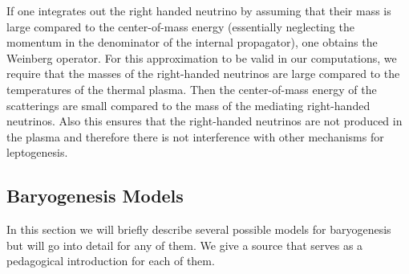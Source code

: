 \documentclass[13pt,a4paper,titlepage]{article}
\begin{document}
If one integrates out the right handed neutrino by assuming that their mass is
large compared to the center-of-mass energy (essentially neglecting the momentum in the denominator of the internal propagator), one obtains the Weinberg operator.
For this approximation to be valid in our computations, we require that
the masses of the right-handed neutrinos are large compared to the temperatures
of the thermal plasma. Then the center-of-mass energy of the scatterings are
small compared to the mass of the mediating right-handed neutrinos.
Also this ensures that the right-handed neutrinos are not produced in the plasma and therefore there is not interference with other mechanisms for leptogenesis.

\subsection{Baryogenesis Models}
In this section we will briefly describe several possible models for baryogenesis but will go into detail for any of them.
We give a source that serves as a pedagogical introduction for each of them.
\end{document}
